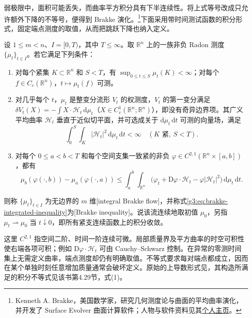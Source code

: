 弱极限中，面积可能丢失，而曲率平方积分具有下半连续性。将上式等号改成只允许额外下降的不等号，便得到 Brakke 演化。\footnote{Kenneth A. Brakke，美国数学家，研究几何测度论与曲面的平均曲率演化，并开发了 Surface Evolver 曲面计算软件；人物与软件资料见其\href{https://kenbrakke.com/}{个人主页}。}下面采用带时间测试函数的积分形式，固定端点测度的取值，从而把跳跃下降也纳入定义。

\begin{definition}\label{g3:def:integral-brakke-flow}
	设 \(1\le m<n\)、\(I=[0,T)\)，其中 \(T\le\infty\)。取 \(\mathbb R^n\) 上的一族非负 Radon 测度 \(\{\mu_t\}_{t\in I}\)。若它满足下列条件：
	\begin{enumerate}
		\item 对每个紧集 \(K\subset\mathbb R^n\) 和 \(S<T\)，有 \(\sup_{0\le t\le S}\mu_t(K)<\infty\)；对每个 \(f\in C_c(\mathbb R^n)\)，\(t\mapsto\mu_t(f)\) 可测。
		\item 对几乎每个 \(t\)，\(\mu_t\) 是整变分流形 \(V_t\) 的权测度，\(V_t\) 的第一变分满足 \(\delta V_t(X)=-\int X\cdot\mathcal H_t\,\mathrm d\mu_t\)（\(X\in C_c^1(\mathbb R^n;\mathbb R^n)\)），即没有奇异边界项。其广义平均曲率 \(\mathcal H_t\) 垂直于近似切平面，并可选成关于 \(\mathrm d\mu_t\,\mathrm dt\) 可测的向量场，满足
		\[
		\int_0^S\int_K|\mathcal H_t|^2\,\mathrm d\mu_t\,\mathrm dt<\infty
		\quad(K\text{ 紧},\ S<T).
		\]
		\item 对每个 \(0\le a<b<T\) 和每个空间支集一致紧的非负 \(\varphi\in C^{2,1}(\mathbb R^n\times[a,b])\)，都有
		\begin{equation}\label{g3:eq:brakke-integrated-inequality}
			\mu_b(\varphi(\cdot,b))-\mu_a(\varphi(\cdot,a))
			\le\int_a^b\int_{\mathbb R^n}
			\bigl(\varphi_t+\mathrm D\varphi\cdot\mathcal H_t
			-\varphi|\mathcal H_t|^2\bigr)\,\mathrm d\mu_t\,\mathrm dt.
		\end{equation}
	\end{enumerate}
	则称 \(\{\mu_t\}_{t\in I}\) 为无边界的 \(m\) 维[integral Brakke flow]，并称式\eqref{g3:eq:brakke-integrated-inequality}为[Brakke inequality]。说该流连续地取初值 \(\mu_0\)，另指 \(\mu_t\rightharpoonup\mu_0\) 当 \(t\downarrow0\)，即所有紧支连续函数上的积分收敛。
\end{definition}

这里 \(C^{2,1}\) 指空间二阶、时间一阶连续可微。局部质量界及平方曲率的时空可积性使右端各项可积；例如 \(\mathrm D\varphi\cdot\mathcal H_t\) 可由 Cauchy--Schwarz 控制。在异常的零测时间集上无需定义曲率，端点测度却仍有明确取值。不等式要求每对端点都成立，因而在某个单独时刻任意增加质量通常会破坏定义。原始的上导数形式见\cite[第3.2--3.3节，第20--22页]{Brakke1978Motion}，其构造所满足的积分不等式见该书第4.29节，式(1)。


